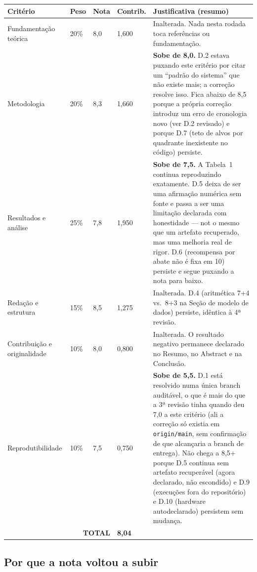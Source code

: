 \documentclass[11pt,a4paper]{article}
\begin{document}
\renewcommand{\arraystretch}{1.3}
\begin{longtable}{|p{4.1cm}|p{1.1cm}|p{1.1cm}|p{1.4cm}|p{6.6cm}|}
\hline
\textbf{Critério} & \textbf{Peso} & \textbf{Nota} & \textbf{Contrib.} & \textbf{Justificativa (resumo)} \\
\hline
\endhead
Fundamentação teórica & 20\% & 8,0 & 1,600 &
Inalterada. Nada nesta rodada toca referências ou fundamentação. \\
\hline
Metodologia & 20\% & 8,3 & 1,660 &
\textbf{Sobe de 8,0.} D.2 estava puxando este critério por citar um ``padrão do sistema'' que não
existe mais; a correção resolve isso. Fica abaixo de 8,5 porque a própria correção introduz um erro
de cronologia novo (ver D.2 revisado) e porque D.7 (teto de alvos por quadrante inexistente no
código) persiste. \\
\hline
Resultados e análise & 25\% & 7,8 & 1,950 &
\textbf{Sobe de 7,5.} A Tabela~1 continua reproduzindo exatamente. D.5 deixa de ser uma afirmação
numérica sem fonte e passa a ser uma limitação declarada com honestidade --- not o mesmo que um
artefato recuperado, mas uma melhoria real de rigor. D.6 (recompensa por abate não é fixa em 10)
persiste e segue puxando a nota para baixo. \\
\hline
Redação e estrutura & 15\% & 8,5 & 1,275 &
Inalterada. D.4 (aritmética 7+4 vs.\ 8+3 na Seção de modelo de dados) persiste, idêntica à 4ª
revisão. \\
\hline
Contribuição e originalidade & 10\% & 8,0 & 0,800 &
Inalterada. O resultado negativo permanece declarado no Resumo, no Abstract e na Conclusão. \\
\hline
Reprodutibilidade & 10\% & 7,5 & 0,750 &
\textbf{Sobe de 5,5.} D.1 está resolvido numa única branch auditável, o que é mais do que a 3ª
revisão tinha quando deu 7,0 a este critério (ali a correção só existia em \texttt{origin/main}, sem
confirmação de que alcançaria a branch de entrega). Não chega a 8,5+ porque D.5 continua sem artefato
recuperável (agora declarado, não escondido) e D.9 (execuções fora do repositório) e D.10 (hardware
autodeclarado) persistem sem mudança. \\
\hline
\multicolumn{3}{|r|}{\textbf{TOTAL}} & \textbf{8,04} & \\
\hline
\end{longtable}

\subsection*{Por que a nota voltou a subir}
\end{document}
